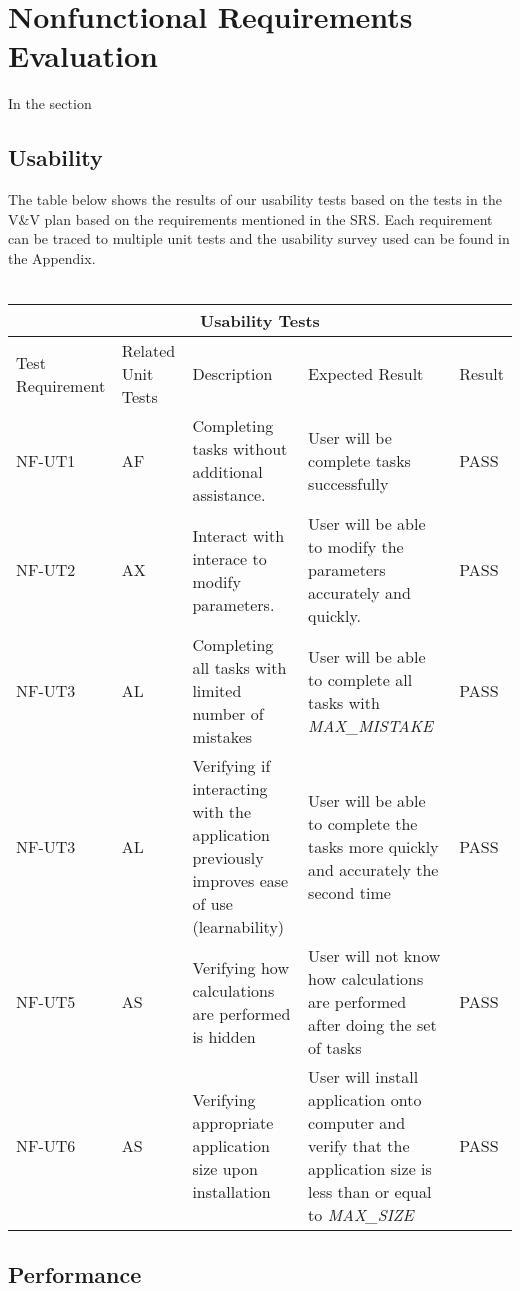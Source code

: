 \documentclass[12pt, titlepage]{article}
\begin{document}
\section{Nonfunctional Requirements Evaluation}

In the section

\pagebreak
\subsection{Usability}
The table below shows the results of our usability tests based on the tests in the V\&V plan based on the requirements mentioned in the SRS.
Each requirement can be traced to multiple unit tests and the usability survey used can be found in the Appendix.\\
\\
\begin{tabular}{ |p{2.5cm}||p{2cm}|p{4cm}|p{4cm}|p{1.5cm}| }
  \hline
  \multicolumn{5}{|c|}{Usability Tests} \\
  \hline
  Test Requirement & Related Unit Tests & Description & Expected Result & Result\\
  \hline
  NF-UT1   & AF  & Completing tasks without additional assistance. & User will be complete tasks successfully & PASS\\
  \hline
  NF-UT2   & AX  & Interact with interace to modify parameters. & User will be able to modify the parameters accurately and quickly.& PASS\\
  \hline
  NF-UT3   & AL  & Completing all tasks with limited number of mistakes & User will be able to complete all tasks with \textsl{MAX\_MISTAKE} & PASS\\
  \hline
  NF-UT3   & AL  & Verifying if interacting with the application previously improves ease of use (learnability)  & User will be able to complete the tasks more quickly and accurately the second time & PASS\\
  \hline
  NF-UT5   & AS  & Verifying how calculations are performed is hidden &  User will not know how calculations are performed after doing the set of tasks & PASS\\
  \hline
  NF-UT6   & AS  & Verifying appropriate application size upon installation&  User will install application onto computer and verify that the application size is less than or equal to \textsl{MAX\_SIZE} & PASS\\
  \hline
 \end{tabular}
		
\subsection{Performance}
\end{document}
